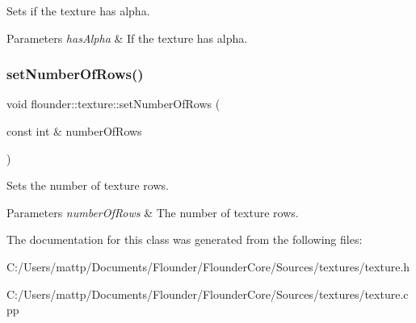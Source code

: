 Sets if the texture has alpha. 


\begin{DoxyParams}{Parameters}
{\em has\+Alpha} & If the texture has alpha. \\
\hline
\end{DoxyParams}
\mbox{\label{classflounder_1_1texture_ac0854bbd1a260380db88f378b408aa18}} 
\subsubsection{\texorpdfstring{set\+Number\+Of\+Rows()}{setNumberOfRows()}}
{\footnotesize\ttfamily void flounder\+::texture\+::set\+Number\+Of\+Rows (\begin{DoxyParamCaption}\item[{const int \&}]{number\+Of\+Rows }\end{DoxyParamCaption})\hspace{0.3cm}{\ttfamily [inline]}}



Sets the number of texture rows. 


\begin{DoxyParams}{Parameters}
{\em number\+Of\+Rows} & The number of texture rows. \\
\hline
\end{DoxyParams}


The documentation for this class was generated from the following files\+:\begin{DoxyCompactItemize}
\item 
C\+:/\+Users/mattp/\+Documents/\+Flounder/\+Flounder\+Core/\+Sources/textures/texture.\+h\item 
C\+:/\+Users/mattp/\+Documents/\+Flounder/\+Flounder\+Core/\+Sources/textures/texture.\+cpp\end{DoxyCompactItemize}
